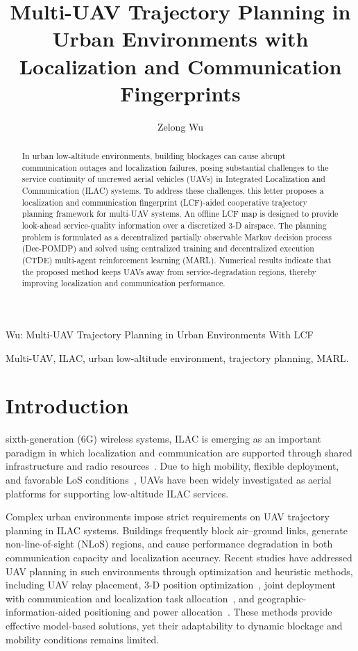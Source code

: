 \documentclass[10pt,journal,letterpaper]{IEEEtran}
\begin{document}
\title{Multi-UAV Trajectory Planning in Urban Environments with Localization and Communication Fingerprints}

\author{Zelong Wu}

%
{Wu: Multi-UAV Trajectory Planning in Urban Environments With LCF}

\maketitle

\begin{abstract}
In urban low-altitude environments, building blockages can cause abrupt communication outages and localization failures, posing substantial challenges to the service continuity of uncrewed aerial vehicles (UAVs) in Integrated Localization and Communication (ILAC) systems. To address these challenges, this letter proposes a localization and communication fingerprint (LCF)-aided cooperative trajectory planning framework for multi-UAV systems. An offline LCF map is designed to provide look-ahead service-quality information over a discretized 3-D airspace. The planning problem is formulated as a decentralized partially observable Markov decision process (Dec-POMDP) and solved using centralized training and decentralized execution (CTDE) multi-agent reinforcement learning (MARL). Numerical results indicate that the proposed method keeps UAVs away from service-degradation regions, thereby improving localization and communication performance.
\end{abstract}

\begin{IEEEkeywords}
Multi-UAV, ILAC, urban low-altitude environment, trajectory planning, MARL.
\end{IEEEkeywords}

\section{Introduction}
 sixth-generation (6G) wireless systems, ILAC is emerging as an important paradigm in which localization and communication are supported through shared infrastructure and radio resources~\cite{ref1}. Due to high mobility, flexible deployment, and favorable LoS conditions~\cite{ref2,ref3,ref4,ref5,ref6}, UAVs have been widely investigated as aerial platforms for supporting low-altitude ILAC services.

Complex urban environments impose strict requirements on UAV trajectory planning in ILAC systems. Buildings frequently block air--ground links, generate non-line-of-sight (NLoS) regions, and cause performance degradation in both communication capacity and localization accuracy. Recent studies have addressed UAV planning in such environments through optimization and heuristic methods, including UAV relay placement, 3-D position optimization~\cite{ref7}, joint deployment with communication and localization task allocation~\cite{ref8}, and geographic-information-aided positioning and power allocation~\cite{ref15}. These methods provide effective model-based solutions, yet their adaptability to dynamic blockage and mobility conditions remains limited.
\end{document}
